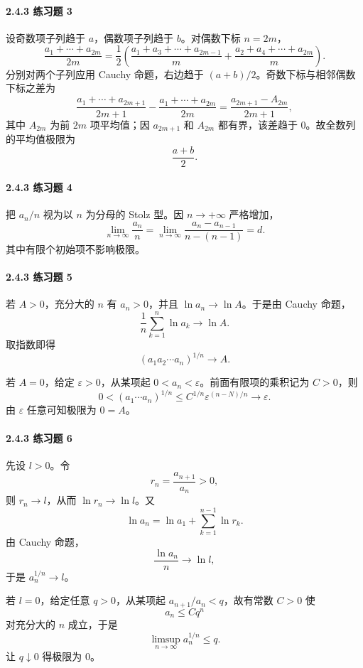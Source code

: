 \paragraph{2.4.3 练习题 3}
\begin{xsolution}
设奇数项子列趋于 $a$，偶数项子列趋于 $b$。对偶数下标 $n=2m$，
\[
  \frac{a_1+\cdots+a_{2m}}{2m}
  =\frac12\left(
    \frac{a_1+a_3+\cdots+a_{2m-1}}m
    +\frac{a_2+a_4+\cdots+a_{2m}}m
  \right).
\]
分别对两个子列应用 Cauchy 命题，右边趋于 $(a+b)/2$。奇数下标与相邻偶数下标之差为
\[
  \frac{a_1+\cdots+a_{2m+1}}{2m+1}
  -\frac{a_1+\cdots+a_{2m}}{2m}
  =\frac{a_{2m+1}-A_{2m}}{2m+1},
\]
其中 $A_{2m}$ 为前 $2m$ 项平均值；因 $a_{2m+1}$ 和 $A_{2m}$ 都有界，该差趋于 $0$。故全数列的平均值极限为
\[
  \boxed{\frac{a+b}{2}}.
\]
\end{xsolution}

\paragraph{2.4.3 练习题 4}
\begin{xsolution}
把 $a_n/n$ 视为以 $n$ 为分母的 Stolz 型。因 $n\to+\infty$ 严格增加，
\[
  \lim_{n\to\infty}\frac{a_n}{n}
  =\lim_{n\to\infty}\frac{a_n-a_{n-1}}{n-(n-1)}=d.
\]
其中有限个初始项不影响极限。
\end{xsolution}

\paragraph{2.4.3 练习题 5}
\begin{xsolution}
若 $A>0$，充分大的 $n$ 有 $a_n>0$，并且 $\ln a_n\to\ln A$。于是由 Cauchy 命题，
\[
  \frac1n\sum_{k=1}^n\ln a_k\to\ln A.
\]
取指数即得
\[
  (a_1a_2\cdots a_n)^{1/n}\to A.
\]

若 $A=0$，给定 $\varepsilon>0$，从某项起 $0<a_n<\varepsilon$。前面有限项的乘积记为 $C>0$，则
\[
  0<(a_1\cdots a_n)^{1/n}
  \le C^{1/n}\varepsilon^{(n-N)/n}\to\varepsilon.
\]
由 $\varepsilon$ 任意可知极限为 $0=A$。
\end{xsolution}

\paragraph{2.4.3 练习题 6}
\begin{xsolution}
先设 $l>0$。令
\[
  r_n=\frac{a_{n+1}}{a_n}>0,
\]
则 $r_n\to l$，从而 $\ln r_n\to\ln l$。又
\[
  \ln a_n=\ln a_1+\sum_{k=1}^{n-1}\ln r_k.
\]
由 Cauchy 命题，
\[
  \frac{\ln a_n}{n}\to\ln l,
\]
于是 $a_n^{1/n}\to l$。

若 $l=0$，给定任意 $q>0$，从某项起 $a_{n+1}/a_n<q$，故有常数 $C>0$ 使
\[
  a_n\le Cq^n
\]
对充分大的 $n$ 成立，于是
\[
  \limsup_{n\to\infty}a_n^{1/n}\le q.
\]
让 $q\downarrow0$ 得极限为 $0$。
\end{xsolution}

